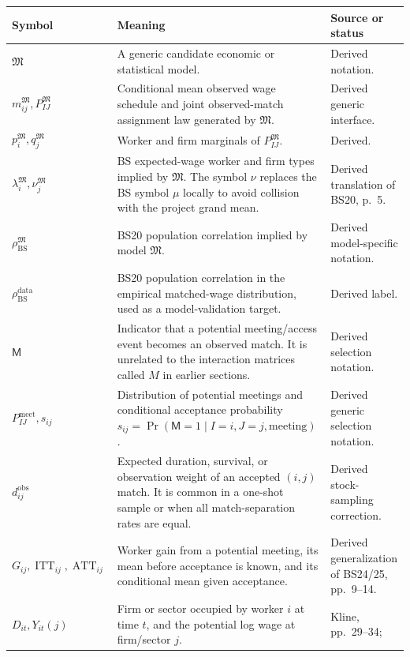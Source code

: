 \documentclass[11pt]{article}
\begin{document}
\begin{longtable}{p{}p{}p{}}
\textbf{Symbol} & \textbf{Meaning} & \textbf{Source or status} \\
\hline
\(\mathfrak M\) & A generic candidate economic or statistical model. &
Derived notation. \\
\(m^{\mathfrak M}_{ij},P^{\mathfrak M}_{IJ}\) & Conditional mean observed
wage schedule and joint observed-match assignment law generated by
\(\mathfrak M\). & Derived generic interface. \\
\(p_i^{\mathfrak M},q_j^{\mathfrak M}\) & Worker and firm marginals of
\(P^{\mathfrak M}_{IJ}\). & Derived. \\
\(\lambda_i^{\mathfrak M},\nu_j^{\mathfrak M}\) & BS expected-wage worker and
firm types implied by \(\mathfrak M\).  The symbol \(\nu\) replaces the BS
symbol \(\mu\) locally to avoid collision with the project grand mean. &
Derived translation of BS20, p.\ 5. \\
\(\rho_{\mathrm{BS}}^{\mathfrak M}\) & BS20 population correlation implied
by model \(\mathfrak M\). & Derived model-specific notation. \\
\(\rho_{\mathrm{BS}}^{\mathrm{data}}\) & BS20 population correlation in the
empirical matched-wage distribution, used as a model-validation target. &
Derived label. \\
\(\mathsf M\) & Indicator that a potential meeting/access event becomes an
observed match.  It is unrelated to the interaction matrices called \(M\) in
earlier sections. & Derived selection notation. \\
\(P^{\mathrm{meet}}_{IJ},s_{ij}\) & Distribution of potential meetings and
conditional acceptance probability
\(s_{ij}=\Pr(\mathsf M=1\mid I=i,J=j,\text{meeting})\). & Derived generic
selection notation. \\
\(d_{ij}^{\mathrm{obs}}\) & Expected duration, survival, or observation
weight of an accepted \((i,j)\) match.  It is common in a one-shot sample or
when all match-separation rates are equal. & Derived stock-sampling
correction. \\
\(G_{ij},\operatorname{ITT}_{ij},\operatorname{ATT}_{ij}\) & Worker gain from
a potential meeting, its mean before acceptance is known, and its conditional
mean given acceptance. & Derived generalization of BS24/25,
pp.\ 9--14. \\
\(D_{it},Y_{it}(j)\) & Firm or sector occupied by worker \(i\) at time \(t\),
and the potential log wage at firm/sector \(j\). & Kline, pp.\ 29--34;

\end{longtable}
\end{document}

